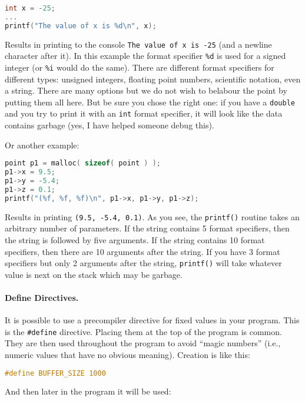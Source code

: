 \begin{lstlisting}[language=C]
int x = -25;
...
printf("The value of x is %d\n", x);
\end{lstlisting}

Results in printing to the console \texttt{The value of x is -25} (and a newline character after it). In this example the format specifier \texttt{\%d} is used for a signed integer (or \texttt{\%i} would do the same). There are different format specifiers for different types: unsigned integers, floating point numbers, scientific notation, even a string. There are many options but we do not wish to belabour the point by putting them all here. But be sure you chose the right one: if you have a \texttt{double} and you try to print it with an \texttt{int} format specifier, it will look like the data contains garbage (yes, I have helped someone debug this).

Or another example:
\begin{lstlisting}[language=C]
point p1 = malloc( sizeof( point ) );
p1->x = 9.5;
p1->y = -5.4;
p1->z = 0.1;
printf("(%f, %f, %f)\n", p1->x, p1->y, p1->z);
\end{lstlisting}

Results in printing \texttt{(9.5, -5.4, 0.1)}. As you see, the \texttt{printf()} routine takes an arbitrary number of parameters. If the string contains 5 format specifiers, then the string is followed by five arguments. If the string contains 10 format specifiers, then there are 10 arguments after the string. If you have 3 format specifiers but only 2 arguments after the string, \texttt{printf()} will take whatever value is next on the stack which may be garbage. 

\paragraph{Define Directives.}

It is possible to use a precompiler directive for fixed values in your program. This is the \texttt{\#define} directive. Placing them at the top of the program is common. They are then used throughout the program to avoid ``magic numbers'' (i.e., numeric values that have no obvious meaning). Creation is like this:

\begin{lstlisting}[language=C]
#define BUFFER_SIZE 1000
\end{lstlisting}

And then later in the program it will be used:

